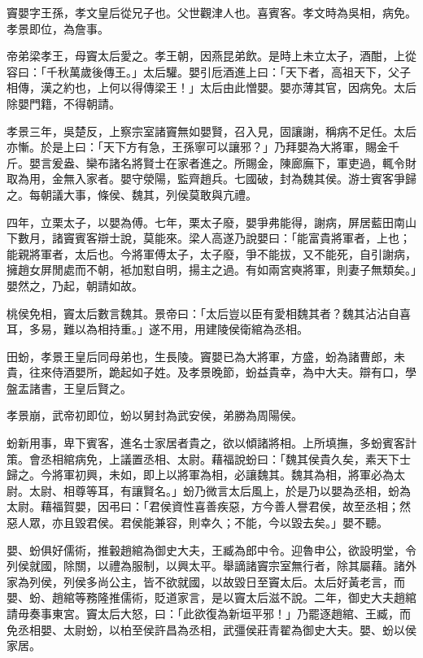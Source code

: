 
\begin{pinyinscope}
竇嬰字王孫，孝文皇后從兄子也。父世觀津人也。喜賓客。孝文時為吳相，病免。孝景即位，為詹事。

帝弟梁孝王，母竇太后愛之。孝王朝，因燕昆弟飲。是時上未立太子，酒酣，上從容曰：「千秋萬歲後傳王。」太后驩。嬰引卮酒進上曰：「天下者，高祖天下，父子相傳，漢之約也，上何以得傳梁王！」太后由此憎嬰。嬰亦薄其官，因病免。太后除嬰門籍，不得朝請。

孝景三年，吳楚反，上察宗室諸竇無如嬰賢，召入見，固讓謝，稱病不足任。太后亦慚。於是上曰：「天下方有急，王孫寧可以讓邪？」乃拜嬰為大將軍，賜金千斤。嬰言爰盎、欒布諸名將賢士在家者進之。所賜金，陳廊廡下，軍吏過，輒令財取為用，金無入家者。嬰守滎陽，監齊趙兵。七國破，封為魏其侯。游士賓客爭歸之。每朝議大事，條侯、魏其，列侯莫敢與亢禮。

四年，立栗太子，以嬰為傅。七年，栗太子廢，嬰爭弗能得，謝病，屏居藍田南山下數月，諸竇賓客辯士說，莫能來。梁人高遂乃說嬰曰：「能富貴將軍者，上也；能親將軍者，太后也。今將軍傅太子，太子廢，爭不能拔，又不能死，自引謝病，擁趙女屏閒處而不朝，袛加懟自明，揚主之過。有如兩宮奭將軍，則妻子無類矣。」嬰然之，乃起，朝請如故。

桃侯免相，竇太后數言魏其。景帝曰：「太后豈以臣有愛相魏其者？魏其沾沾自喜耳，多易，難以為相持重。」遂不用，用建陵侯衛綰為丞相。

田蚡，孝景王皇后同母弟也，生長陵。竇嬰已為大將軍，方盛，蚡為諸曹郎，未貴，往來侍酒嬰所，跪起如子姓。及孝景晚節，蚡益貴幸，為中大夫。辯有口，學盤盂諸書，王皇后賢之。

孝景崩，武帝初即位，蚡以舅封為武安侯，弟勝為周陽侯。

蚡新用事，卑下賓客，進名士家居者貴之，欲以傾諸將相。上所填撫，多蚡賓客計策。會丞相綰病免，上議置丞相、太尉。藉福說蚡曰：「魏其侯貴久矣，素天下士歸之。今將軍初興，未如，即上以將軍為相，必讓魏其。魏其為相，將軍必為太尉。太尉、相尊等耳，有讓賢名。」蚡乃微言太后風上，於是乃以嬰為丞相，蚡為太尉。藉福賀嬰，因弔曰：「君侯資性喜善疾惡，方今善人譽君侯，故至丞相；然惡人眾，亦且毀君侯。君侯能兼容，則幸久；不能，今以毀去矣。」嬰不聽。

嬰、蚡俱好儒術，推轂趙綰為御史大夫，王臧為郎中令。迎魯申公，欲設明堂，令列侯就國，除關，以禮為服制，以興太平。舉謫諸竇宗室無行者，除其屬藉。諸外家為列侯，列侯多尚公主，皆不欲就國，以故毀日至竇太后。太后好黃老言，而嬰、蚡、趙綰等務隆推儒術，貶道家言，是以竇太后滋不說。二年，御史大夫趙綰請毋奏事東宮。竇太后大怒，曰：「此欲復為新垣平邪！」乃罷逐趙綰、王臧，而免丞相嬰、太尉蚡，以柏至侯許昌為丞相，武彊侯莊青翟為御史大夫。嬰、蚡以侯家居。


\end{pinyinscope}
